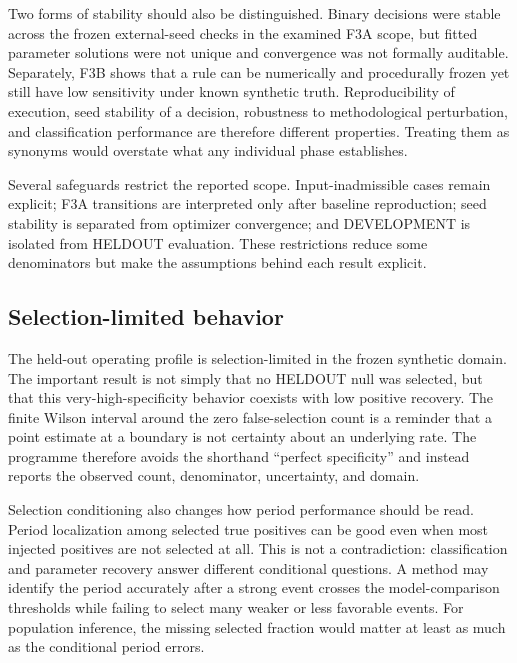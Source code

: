 \documentclass[11pt,a4paper]{article}
\begin{document}
Two forms of stability should also be distinguished. Binary decisions were stable across the frozen external-seed checks in the examined F3A scope, but fitted parameter solutions were not unique and convergence was not formally auditable. Separately, F3B shows that a rule can be numerically and procedurally frozen yet still have low sensitivity under known synthetic truth. Reproducibility of execution, seed stability of a decision, robustness to methodological perturbation, and classification performance are therefore different properties. Treating them as synonyms would overstate what any individual phase establishes.

Several safeguards restrict the reported scope. Input-inadmissible cases remain explicit; F3A transitions are interpreted only after baseline reproduction; seed stability is separated from optimizer convergence; and DEVELOPMENT is isolated from HELDOUT evaluation. These restrictions reduce some denominators but make the assumptions behind each result explicit.

\subsection{Selection-limited behavior}
The held-out operating profile is selection-limited in the frozen synthetic domain. The important result is not simply that no HELDOUT null was selected, but that this very-high-specificity behavior coexists with low positive recovery. The finite Wilson interval around the zero false-selection count is a reminder that a point estimate at a boundary is not certainty about an underlying rate. The programme therefore avoids the shorthand ``perfect specificity'' and instead reports the observed count, denominator, uncertainty, and domain.

Selection conditioning also changes how period performance should be read. Period localization among selected true positives can be good even when most injected positives are not selected at all. This is not a contradiction: classification and parameter recovery answer different conditional questions. A method may identify the period accurately after a strong event crosses the model-comparison thresholds while failing to select many weaker or less favorable events. For population inference, the missing selected fraction would matter at least as much as the conditional period errors.
\end{document}

